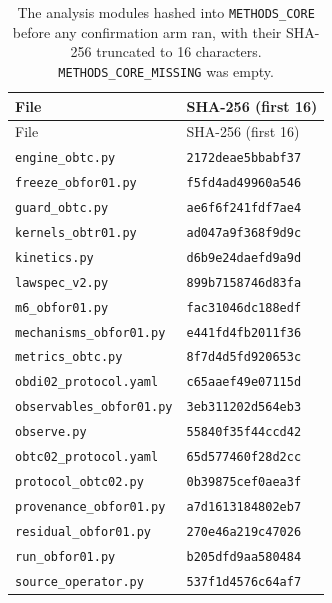 \begin{longtable}{ll}
\caption{The analysis modules hashed into \texttt{METHODS\_CORE} before any confirmation arm ran, with their SHA-256 truncated to 16 characters. \texttt{METHODS\_CORE\_MISSING} was empty.}\label{tab:methods}\\
\toprule File & SHA-256 (first 16) \\ \midrule \endfirsthead
\toprule File & SHA-256 (first 16) \\ \midrule \endhead
\bottomrule \endfoot
\texttt{engine\_\allowbreak{}obtc.py} & \texttt{2172deae5bbabf37} \\
\texttt{freeze\_\allowbreak{}obfor01.py} & \texttt{f5fd4ad49960a546} \\
\texttt{guard\_\allowbreak{}obtc.py} & \texttt{ae6f6f241fdf7ae4} \\
\texttt{kernels\_\allowbreak{}obtr01.py} & \texttt{ad047a9f368f9d9c} \\
\texttt{kinetics.py} & \texttt{d6b9e24daefd9a9d} \\
\texttt{lawspec\_\allowbreak{}v2.py} & \texttt{899b7158746d83fa} \\
\texttt{m6\_\allowbreak{}obfor01.py} & \texttt{fac31046dc188edf} \\
\texttt{mechanisms\_\allowbreak{}obfor01.py} & \texttt{e441fd4fb2011f36} \\
\texttt{metrics\_\allowbreak{}obtc.py} & \texttt{8f7d4d5fd920653c} \\
\texttt{obdi02\_\allowbreak{}protocol.yaml} & \texttt{c65aaef49e07115d} \\
\texttt{observables\_\allowbreak{}obfor01.py} & \texttt{3eb311202d564eb3} \\
\texttt{observe.py} & \texttt{55840f35f44ccd42} \\
\texttt{obtc02\_\allowbreak{}protocol.yaml} & \texttt{65d577460f28d2cc} \\
\texttt{protocol\_\allowbreak{}obtc02.py} & \texttt{0b39875cef0aea3f} \\
\texttt{provenance\_\allowbreak{}obfor01.py} & \texttt{a7d1613184802eb7} \\
\texttt{residual\_\allowbreak{}obfor01.py} & \texttt{270e46a219c47026} \\
\texttt{run\_\allowbreak{}obfor01.py} & \texttt{b205dfd9aa580484} \\
\texttt{source\_\allowbreak{}operator.py} & \texttt{537f1d4576c64af7} \\
\end{longtable}
